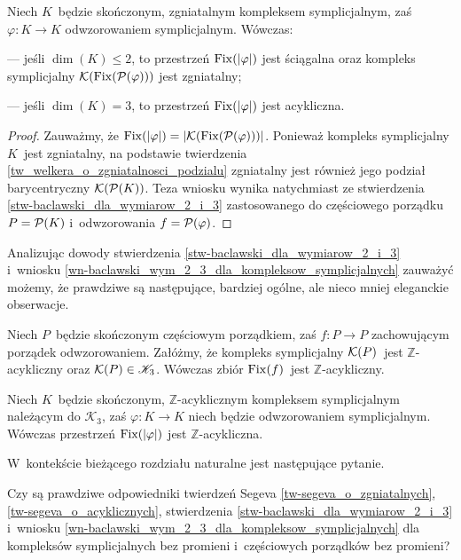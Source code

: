 \begin{wn}\label{wn-baclawski_wym_2_3_dla_kompleksow_symplicjalnych}
Niech $K$~będzie skończonym, zgniatalnym kompleksem symplicjalnym, zaś $\varphi\colon K\to K$ odwzorowaniem symplicjalnym. Wówczas:
\begin{compactitem}
\item[---] jeśli $\dim(K)\leq 2$, to przestrzeń $\operatorname{Fix}(|\varphi|)$ jest ściągalna oraz kompleks symplicjalny $\mathcal{K}(\operatorname{Fix}(\mathcal{P}(\varphi)))$ jest zgniatalny;
\item[---] jeśli $\dim(K)=3$, to przestrzeń $\operatorname{Fix}(|\varphi|)$ jest acykliczna.
\end{compactitem}
\end{wn}
\begin{proof}
Zauważmy, że $\operatorname{Fix}(|\varphi|)=|\mathcal{K}(\operatorname{Fix}(\mathcal{P}(\varphi)))|$. Ponieważ kompleks symplicjalny $K$~jest zgniatalny, na podstawie twierdzenia \ref{tw_welkera_o_zgniatalnosci_podzialu} zgniatalny jest również jego podział barycentryczny $\mathcal{K}(\mathcal{P}(K))$. Teza wniosku wynika natychmiast ze stwierdzenia \ref{stw-baclawski_dla_wymiarow_2_i_3} zastosowanego do częściowego porządku $P=\mathcal{P}(K)$ i~odwzorowania $f=\mathcal{P}(\varphi)$. 
\end{proof}

Analizując dowody stwierdzenia \ref{stw-baclawski_dla_wymiarow_2_i_3} i~wniosku \ref{wn-baclawski_wym_2_3_dla_kompleksow_symplicjalnych} zauważyć możemy, że prawdziwe są następujące, bardziej ogólne, ale nieco mniej eleganckie obserwacje.

\begin{stw}
Niech $P$~będzie skończonym częściowym porządkiem, zaś $f\colon P\to P$ zachowującym porządek odwzorowaniem. Załóżmy, że kompleks symplicjalny $\mathcal{K}(P)$~jest $\mathbb{Z}$-acykliczny oraz $\mathcal{K}(P)\in\mathscr{K}_3$. Wówczas zbiór $\operatorname{Fix}(f)$~jest $\mathbb{Z}$-acykliczny.
\end{stw}

\begin{wn}
Niech $K$~będzie skończonym, $\mathbb{Z}$-acyklicznym kompleksem symplicjalnym należącym do $\mathscr{K}_3$, zaś $\varphi\colon K\to K$ niech będzie odwzorowaniem symplicjalnym. Wówczas przestrzeń $\operatorname{Fix}(|\varphi|)$ jest $\mathbb{Z}$-acykliczna.
\end{wn}

W~kontekście bieżącego rozdziału naturalne jest następujące pytanie.
\begin{problem}\label{prob100}
Czy są prawdziwe odpowiedniki twierdzeń Segeva \ref{tw-segeva_o_zgniatalnych}, \ref{tw-segeva_o_acyklicznych}, stwierdzenia \ref{stw-baclawski_dla_wymiarow_2_i_3} i~wniosku \ref{wn-baclawski_wym_2_3_dla_kompleksow_symplicjalnych} dla kompleksów symplicjalnych bez promieni i~częściowych porządków bez promieni?
\end{problem}

